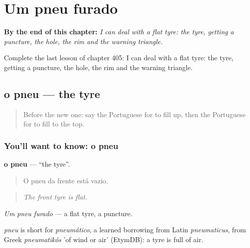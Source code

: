
\chapter{Um pneu furado}
\label{ch:pt-um-pneu-furado}

\begin{chapteropening}
\textbf{By the end of this chapter:} \emph{I can deal with a flat tyre: the tyre, getting a puncture, the hole, the rim and the warning triangle.}

Complete the last lesson of chapter 405: I can deal with a flat tyre: the tyre, getting a puncture, the hole, the rim and the warning triangle.
\end{chapteropening}

\section[o pneu]{o pneu — the tyre}

\label{lesson:PT-C405-pneu}



\begin{quote}
Before the new one: say the Portuguese for to fill up, then the Portuguese for to fill to the top.
\end{quote}

\subsection*{You'll want to know: o pneu}
\textbf{o pneu} — \textquotedblleft{}the tyre\textquotedblright{}.

\begin{quote}
O pneu da frente está vazio.
\end{quote}

\begin{quote}
\emph{The front tyre is flat.}
\end{quote}

\emph{Um pneu furado} — a flat tyre, a puncture.

\begin{cousinweb}
\emph{pneu} is short for \emph{pneumático}, a learned borrowing from Latin \emph{pneumaticus}, from Greek \emph{pneumatikós} 'of wind or air' (EtymDB): a tyre is full of air.
\end{cousinweb}

